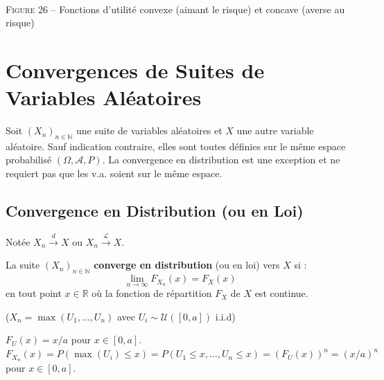 \begin{exemple}
\begin{center}
\\[0.5em]
\textsc{Figure 26} – Fonctions d'utilité convexe (aimant le risque) et concave (averse au risque)
\end{center}
\end{exemple}

\section{Convergences de Suites de Variables Aléatoires}

Soit $(X_n)_{n \in \mathbb{N}}$ une suite de variables aléatoires et $X$ une autre variable aléatoire. Sauf indication contraire, elles sont toutes définies sur le même espace probabilisé $(\Omega, \mathcal{A}, P)$. La convergence en distribution est une exception et ne requiert pas que les v.a. soient sur le même espace.

\subsection{Convergence en Distribution (ou en Loi)}

Notée $X_n \xrightarrow{d} X$ ou $X_n \xrightarrow{\mathcal{L}} X$.

\begin{definition}
La suite $(X_n)_{n \in \mathbb{N}}$ \textbf{converge en distribution} (ou en loi) vers $X$ si :
\[ \lim_{n \to \infty} F_{X_n}(x) = F_X(x) \]
en tout point $x \in \mathbb{R}$ où la fonction de répartition $F_X$ de $X$ est continue.
\end{definition}

\begin{exemple}($X_n = \max(U_1, \dots, U_n)$ avec $U_i \sim \mathcal{U}([0, a])$ i.i.d)

$F_U(x) = x/a$ pour $x \in [0, a]$.\\
$F_{X_n}(x) = P(\max(U_i) \le x) = P(U_1 \le x, \dots, U_n \le x) = (F_U(x))^n = (x/a)^n$ pour $x \in [0, a]$.
\end{exemple}

